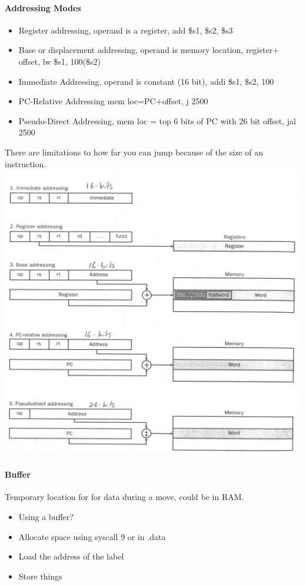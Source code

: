 \documentclass[12 pt]{article}
\begin{document}
\paragraph{Addressing Modes}
\begin{itemize}
\item Register addressing, operand is a register, add \$s1, \$s2, \$s3
\item Base or displacement addressing, operand is memory location, register$+$ offset, lw \$s1, 100(\$s2)
\item Immediate Addressing, operand is constant (16 bit), addi \$s1, \$s2, 100
\item PC-Relative Addressing mem loc=PC$+$offset, j 2500
\item Pseudo-Direct Addressing, mem loc = top 6 bits of PC with 26 bit offset, jal 2500 
\end{itemize}
There are limitations to how far you can jump because of the size of an instruction.
\\ \includegraphics[scale=0.3]{am}
\paragraph{Buffer} Temporary location for for data during a move, could be in RAM.
\begin{itemize}
\item Using a buffer?
\item Allocate space using syscall 9 or in .data
\item Load the address of the label
\item Store things
\end{itemize}
\end{document}
